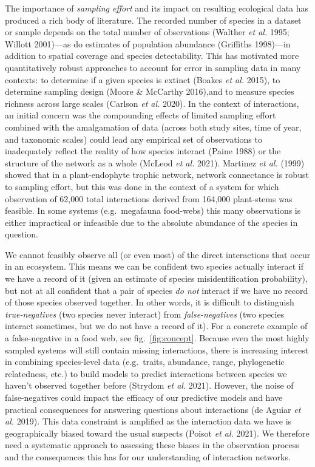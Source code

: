 \documentclass[10pt,oneside]{article}
\begin{document}
The importance of \emph{sampling effort} and its impact on resulting
ecological data has produced a rich body of literature. The recorded
number of species in a dataset or sample depends on the total number of
observations (Walther \emph{et al.} 1995; Willott 2001)---as do
estimates of population abundance (Griffiths 1998)---in addition to
spatial coverage and species detectability. This has motivated more
quantitatively robust approaches to account for error in sampling data
in many contexts: to determine if a given species is extinct (Boakes
\emph{et al.} 2015), to determine sampling design (Moore \& McCarthy
2016),and to measure species richness across large scales (Carlson
\emph{et al.} 2020). In the context of interactions, an initial concern
was the compounding effects of limited sampling effort combined with the
amalgamation of data (across both study sites, time of year, and
taxonomic scales) could lead any empirical set of observations to
inadequately reflect the reality of how species interact (Paine 1988) or
the structure of the network as a whole (McLeod \emph{et al.} 2021).
Martinez \emph{et al.} (1999) showed that in a plant-endophyte trophic
network, network connectance is robust to sampling effort, but this was
done in the context of a system for which observation of 62,000 total
interactions derived from 164,000 plant-stems was feasible. In some
systems (e.g.~megafauna food-webs) this many observations is either
impractical or infeasible due to the absolute abundance of the species
in question.

We cannot feasibly observe all (or even most) of the direct interactions
that occur in an ecosystem. This means we can be confident two species
actually interact if we have a record of it (given an estimate of
species misidentification probability), but not at all confident that a
pair of species \emph{do not} interact if we have no record of those
species observed together. In other words, it is difficult to
distinguish \emph{true-negatives} (two species never interact) from
\emph{false-negatives} (two species interact sometimes, but we do not
have a record of it). For a concrete example of a false-negative in a
food web, see fig.~\ref{fig:concept}. Because even the most highly
sampled systems will still contain missing interactions, there is
increasing interest in combining species-level data (e.g.~traits,
abundance, range, phylogenetic relatedness, etc.) to build models to
predict interactions between species we haven't observed together before
(Strydom \emph{et al.} 2021). However, the noise of false-negatives
could impact the efficacy of our predictive models and have practical
consequences for answering questions about interactions (de Aguiar
\emph{et al.} 2019). This data constraint is amplified as the
interaction data we have is geographically biased toward the usual
suspects (Poisot \emph{et al.} 2021). We therefore need a systematic
approach to assessing these biases in the observation process and the
consequences this has for our understanding of interaction networks.
\end{document}

